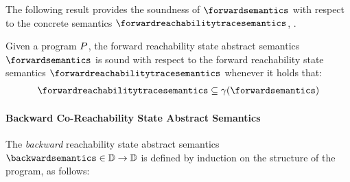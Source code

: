 The following result provides the soundness of $\forwardsemantics$ with respect to the concrete semantics $\forwardreachabilitytracesemantics$, \cf{} .

\begin{theorem}
  Given a program $P$, the forward reachability state abstract semantics $\forwardsemantics$ is sound with respect to the forward reachability state semantics $\forwardreachabilitytracesemantics$ whenever it holds that:
  \begin{align*}
    \forwardreachabilitytracesemantics \subseteq \abstractdomainconcretization(\forwardsemantics)
  \end{align*}
\end{theorem}

\paragraph{Backward Co-Reachability State Abstract Semantics}

The \emph{backward} reachability state abstract semantics $\backwardsemantics\in\backwardtype$ is defined by induction on the structure of the program, as follows:

